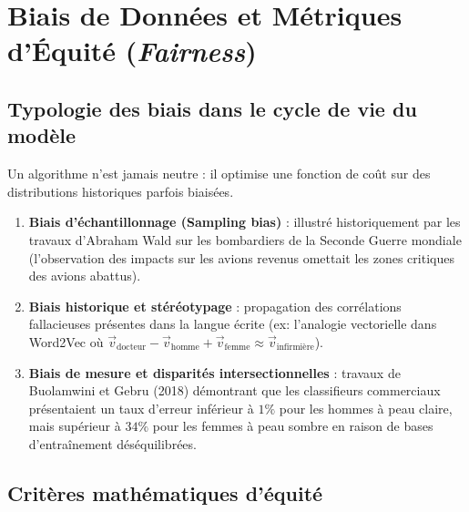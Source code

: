 
\section{Biais de Données et Métriques d'Équité (\emph{Fairness})}

\subsection{Typologie des biais dans le cycle de vie du modèle}

Un algorithme n'est jamais neutre : il optimise une fonction de coût sur des distributions historiques parfois biaisées.
\begin{enumerate}
    \item \textbf{Biais d'échantillonnage (Sampling bias)} : illustré historiquement par les travaux d'Abraham Wald sur les bombardiers de la Seconde Guerre mondiale (l'observation des impacts sur les avions revenus omettait les zones critiques des avions abattus).
    \item \textbf{Biais historique et stéréotypage} : propagation des corrélations fallacieuses présentes dans la langue écrite (ex: l'analogie vectorielle dans Word2Vec où $\vec{v}_{\text{docteur}} - \vec{v}_{\text{homme}} + \vec{v}_{\text{femme}} \approx \vec{v}_{\text{infirmière}}$).
    \item \textbf{Biais de mesure et disparités intersectionnelles} : travaux de Buolamwini et Gebru (2018) démontrant que les classifieurs commerciaux présentaient un taux d'erreur inférieur à $1\%$ pour les hommes à peau claire, mais supérieur à $34\%$ pour les femmes à peau sombre en raison de bases d'entraînement déséquilibrées.
\end{enumerate}

\subsection{Critères mathématiques d'équité}

